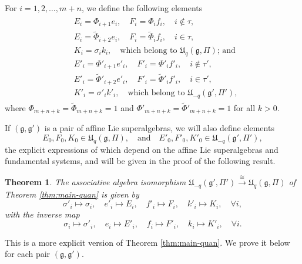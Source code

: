 \documentclass[12pt]{amsart}
\newtheorem{theorem}{Theorem}[section]
\theoremstyle{definition}
\theoremstyle{remark}
\numberwithin{equation}{section}
\begin{document}
For $i=1,2,\dots,m+n$, we define the following elements
\begin{eqnarray}\label{eq:connect B}
\begin{aligned}
&E_{i}=\Phi_{i+1}e_i,\quad F_{i}=\Phi_if_i,\quad i\notin \tau, \\
&E_i=\tilde{\Phi}_{i+2}e_i,\quad F_i=\tilde{\Phi}_{i}f_i,\quad i\in \tau,\\
&K_i=\sigma_i k_i, \quad \text{which belong to ${{\mathfrak U}}_q({{\mathfrak g}}, \Pi)$; and}  \\
&E'_{i}=\Phi'_{i+1}e'_i,\quad F'_{i}=\Phi'_i f'_i,\quad i\notin \tau', \\
&E'_i=\tilde{\Phi}'_{i+2}e'_i,\quad F'_i=\tilde{\Phi}'_{i}f'_i,\quad i\in \tau',\\
&K'_i=\sigma'_i k'_i,  \quad  \text{which belong to ${{\mathfrak U}}_{-q}({{\mathfrak g}}', \Pi')$},
\end{aligned}
\end{eqnarray}
where $\Phi_{m+n+k}=\tilde{\Phi}_{m+n+k}=1$ and
$\Phi'_{m+n+k}=\tilde{\Phi}'_{m+n+k}=1$
for all $k>0$.

If $({{\mathfrak g}}, {{\mathfrak g}}')$ is a pair of affine Lie superalgebras, we will also  define  elements
\[
E_0, F_0, K_0\in {{\mathfrak U}}_q({{\mathfrak g}}, \Pi), \quad \text{and} \quad E'_0, F'_0, K'_0\in{{\mathfrak U}}_{-q}({{\mathfrak g}}', \Pi'),
\]
the explicit expressions of which depend on the affine Lie superalgebras
and fundamental systems, and will be given in the proof of the following result.

\begin{theorem}\label{thm:iso-main} The associative algebra isomorphism
$ {{\mathfrak U}}_{-q}({{\mathfrak g}}', \Pi')\stackrel{\cong}{\longrightarrow}{{\mathfrak U}}_q({{\mathfrak g}}, \Pi)$ of Theorem \ref{thm:main-quan} is given by
\begin{equation}\label{eq:B-map}
\sigma'_i\mapsto \sigma_i, \quad e'_i \mapsto E_i, \quad f'_i \mapsto F_i, \quad k'_i \mapsto K_i, \quad \forall i,
\end{equation}
with the inverse map
\begin{equation}\label{eq:B-map-inv}
\sigma_i\mapsto \sigma'_i, \quad e_i \mapsto E'_i, \quad f_i \mapsto F'_i, \quad k_i \mapsto K'_i, \quad \forall i.
\end{equation}
\end{theorem}
This is a more explicit version of Theorem \ref{thm:main-quan}.
We prove it  below for each pair $({{\mathfrak g}}, {{\mathfrak g}}')$. 
\end{document}
